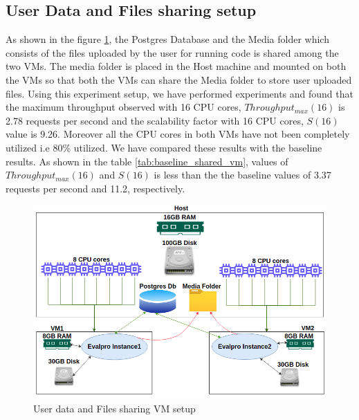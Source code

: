\documentclass{iitbreport}
\begin{document}
\subsection{User Data and Files sharing setup}
As shown in the figure \ref{shared_vm}, the Postgres Database and the Media folder which consists of the files uploaded by the user for running code is shared among the two VMs. The media folder is placed in the Host machine and mounted on both the VMs so that both the VMs can share the Media folder to store user uploaded files. Using this experiment setup, we have performed experiments and found that the maximum throughput observed with 16 CPU cores, $Throughput_{max}(16)$ is 2.78 requests per second and the  scalability factor with 16 CPU cores, $S(16)$ value is 9.26. Moreover all the CPU cores in both VMs have not been completely utilized i.e 80\% utilized.  We have compared these results with the baseline results. As shown in the table \ref{tab:baseline_shared_vm}, values of $Throughput_{max}(16)$ and $S(16)$ is less than the the baseline values of 3.37 requests per second and 11.2, respectively.
\begin{figure}[!htb]
  \centering
  \includegraphics[width=\linewidth]{Images/shared_vm.png}
  \caption{User data and Files sharing VM setup}
  \label{shared_vm}
\end{figure}
\end{document}
